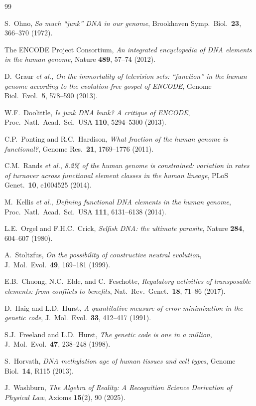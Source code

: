 \documentclass[11pt,a4paper]{article}
\begin{document}
\begin{thebibliography}{99}

S.~Ohno, \emph{So much ``junk'' DNA in our genome}, Brookhaven Symp.\ Biol.\ \textbf{23}, 366--370 (1972).

The ENCODE Project Consortium, \emph{An integrated encyclopedia of DNA elements in the human genome}, Nature \textbf{489}, 57--74 (2012).

D.~Graur \emph{et al.}, \emph{On the immortality of television sets: ``function'' in the human genome according to the evolution-free gospel of ENCODE}, Genome Biol.\ Evol.\ \textbf{5}, 578--590 (2013).

W.F.~Doolittle, \emph{Is junk DNA bunk? A critique of ENCODE}, Proc.\ Natl.\ Acad.\ Sci.\ USA \textbf{110}, 5294--5300 (2013).

C.P.~Ponting and R.C.~Hardison, \emph{What fraction of the human genome is functional?}, Genome Res.\ \textbf{21}, 1769--1776 (2011).

C.M.~Rands \emph{et al.}, \emph{8.2\% of the human genome is constrained: variation in rates of turnover across functional element classes in the human lineage}, PLoS Genet.\ \textbf{10}, e1004525 (2014).

M.~Kellis \emph{et al.}, \emph{Defining functional DNA elements in the human genome}, Proc.\ Natl.\ Acad.\ Sci.\ USA \textbf{111}, 6131--6138 (2014).

L.E.~Orgel and F.H.C.~Crick, \emph{Selfish DNA: the ultimate parasite}, Nature \textbf{284}, 604--607 (1980).

A.~Stoltzfus, \emph{On the possibility of constructive neutral evolution}, J.\ Mol.\ Evol.\ \textbf{49}, 169--181 (1999).

E.B.~Chuong, N.C.~Elde, and C.~Feschotte, \emph{Regulatory activities of transposable elements: from conflicts to benefits}, Nat.\ Rev.\ Genet.\ \textbf{18}, 71--86 (2017).

D.~Haig and L.D.~Hurst, \emph{A quantitative measure of error minimization in the genetic code}, J.\ Mol.\ Evol.\ \textbf{33}, 412--417 (1991).

S.J.~Freeland and L.D.~Hurst, \emph{The genetic code is one in a million}, J.\ Mol.\ Evol.\ \textbf{47}, 238--248 (1998).

S.~Horvath, \emph{DNA methylation age of human tissues and cell types}, Genome Biol.\ \textbf{14}, R115 (2013).

J.~Washburn, \emph{The Algebra of Reality: A Recognition Science Derivation of Physical Law}, Axioms \textbf{15}(2), 90 (2025).

\end{thebibliography}
\end{document}
